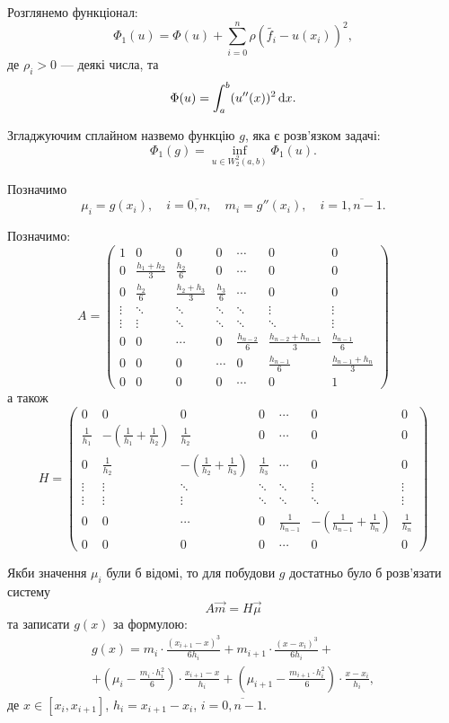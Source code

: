 Розглянемо функціонал: \[ \Phi_1(u) = \Phi(u) + \sum_{i = 0}^n \rho \left( \tilde{f_i} - u(x_i) \right)^2,\] де $\rho_i > 0$ --- деякі числа, та \[\Phi(u) = \int_a^b (u''(x))^2 \mathop{}\!\mathrm{d} x.\]

Згладжуючим сплайном назвемо функцію $g$, яка є розв'язком задачі: \[ \Phi_1(g) = \inf_{u \in W_2^2(a, b)} \Phi_1(u).\]

Позначимо \[ \mu_i = g(x_i), \quad i = \overline{0, n}, \quad m_i = g''(x_i), \quad i = \overline{1, n - 1}.\]

Позначимо: \[ A = \begin{pmatrix}
    1 & 0 & 0 & 0 & \cdots & 0 & 0 \\
    0 & \frac{h_1 + h_2}{3} & \frac{h_2}{6} & 0 & \cdots & 0 & 0 \\
    0 & \frac{h_2}{6} & \frac{h_2 + h_3}{3} & \frac{h_3}{6} & \cdots & 0 & 0 \\
    \vdots & \ddots & \ddots & \ddots & \ddots & \vdots & \vdots \\
    \vdots & \vdots & \ddots & \ddots & \ddots & \ddots & \vdots \\
    0 & 0 & \cdots & 0 & \frac{h_{n - 2}}{6} & \frac{h_{n - 2} + h_{n - 1}}{3} & \frac{h_{n - 1}}{6} \\
    0 & 0 & 0 & \cdots & 0 & \frac{h_{n - 1}}{6} & \frac{h_{n - 1} + h_n}{3} \\
    0 & 0 & 0 & 0 & \cdots & 0 & 1
\end{pmatrix} \]
а також
\[ H = \begin{pmatrix}
    0 & 0 & 0 & 0 & \cdots & 0 & 0 \\
    \frac{1}{h_1} & - \left( \frac{1}{h_1} + \frac{1}{h_2} \right) & \frac{1}{h_2} & 0 & \cdots & 0 & 0 \\
    0 & \frac{1}{h_2} & - \left( \frac{1}{h_2} + \frac{1}{h_3} \right) & \frac{1}{h_3} & \cdots & 0 & 0 \\
    \vdots & \vdots & \ddots & \ddots & \ddots & \vdots & \vdots \\
    \vdots & \vdots & \vdots & \ddots & \ddots & \ddots & \vdots \\
    0 & 0 & \cdots & 0 & \frac{1}{h_{n - 1}} & - \left( \frac{1}{h_{n - 1}} + \frac{1}{h_n} \right) & \frac{1}{h_n} \\
    0 & 0 & 0 & 0 & \cdots & 0 & 0
\end{pmatrix} \]

Якби значення $\mu_i$ були б відомі, то для побудови $g$ достатньо було б розв'язати систему \[ A \vec m = H \vec \mu \] та записати $g(x)$ за формулою:
\begin{multline} 
    \label{eq}
    g(x) = m_i \cdot \frac{(x_{i + 1} - x)^3}{6 h_i} + m_{i + 1} \cdot \frac{(x - x_i)^3}{6 h_i} + \\
    + \left( \mu_i - \frac{m_i \cdot h_i^2}{6} \right) \cdot \frac{x_{i + 1} - x}{h_i} + \left( \mu_{i + 1} - \frac{m_{i + 1} \cdot h_i^2}{6}\right) \cdot \frac{x - x_i}{h_i}, 
\end{multline}
де $x \in [x_i, x_{i + 1}]$, $h_i = x_{i + 1} - x_i$, $i = \overline{0, n - 1}$. \medskip


